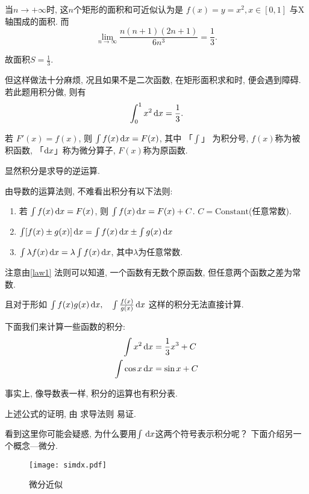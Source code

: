 当$n \to +\infty$时,
这$n$个矩形的面积和可近似认为是 $f(x) = y = x^{2},x\in [0, 1] $ 与X轴围成的面积.
而
\[
  \lim_{n \to \infty} \frac{n(n+1)(2n+1)}{6n^3 } = \frac{1}{3}
.\]

故面积$ S = \frac{1}{3}$.

但这样做法十分麻烦, 况且如果不是二次函数, 在矩形面积求和时, 便会遇到障碍.
若此题用积分做, 则有
\[
  \int_{0}^{1} x^{2} \mathop{}\!\mathrm{d} x= \frac{1}{3}
.\]
\begin{definition}[积分]
  若 $F'(x) = f(x)$, 则 $\int f(x) \mathop{}\!\mathrm{d} x = F(x)$, 其中 「$\int $」 为积分号,
  $f(x)$称为被积函数, 「$\mathop{}\!\mathrm{d} x$」称为微分算子, $F(x)$称为原函数.
\end{definition}
显然积分是求导的逆运算.

由导数的运算法则, 不难看出积分有以下法则:
\begin{enumerate}

  \item \label{law1} 若 $\int f(x) \mathop{}\!\mathrm{d} x = F(x)$, 则 $\int  f(x) \mathop{}\!\mathrm{d} x
    = F(x) + C$. $C = \mathrm{Constant} $(任意常数).
  \item $\int [f(x) \pm g(x)] \mathop{}\!\mathrm{d} x = \int f(x) \mathop{}\!\mathrm{d} x \pm \int g(x) \mathop{}\!\mathrm{d} x$
  \item $\int \lambda f(x) \mathop{}\!\mathrm{d} x = \lambda \int f(x) \mathop{}\!\mathrm{d} x$,
    其中$\lambda $为任意常数.

\end{enumerate}

注意由\cref{law1} 法则可以知道, 一个函数有无数个原函数,
但任意两个函数之差为常数.

且对于形如 $\int f(x)g(x) \mathop{}\!\mathrm{d} x,\quad \int \frac{f(x)}{g(x)} \mathop{}\!\mathrm{d} x$ 这样的积分无法直接计算.

下面我们来计算一些函数的积分:
\begin{align*}
  \int x^{2} \mathop{}\!\mathrm{d} x  & = \frac{1}{3} x ^3 +C \\
  \int \cos x \mathop{}\!\mathrm{d} x & = \sin x + C
\end{align*}

事实上, 像导数表一样, 积分的运算也有积分表.



上述公式的证明, 由 求导法则 易证.

看到这里你可能会疑惑, 为什么要用$\int \,\mathop{}\!\mathrm{d} x$这两个符号表示积分呢？
下面介绍另一个概念---微分.

\begin{figure}[!ht]
  \begin{center}
    \texttt{[image: simdx.pdf]}
    \caption{微分近似}\label{fig:simdx}
  \end{center}
\end{figure}

